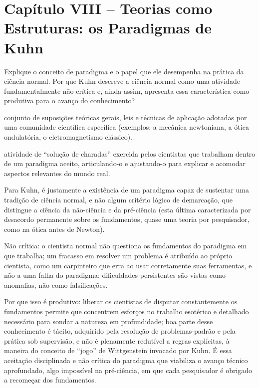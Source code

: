\documentclass[10pt]{extarticle}
\newcommand{\resposta}[1]{\par\smallskip\noindent #1}
\begin{document}
\section*{Capítulo VIII -- Teorias como Estruturas: os Paradigmas de Kuhn}
\begin{questoes}

\item Explique o conceito de paradigma e o papel que ele desempenha na prática da ciência normal. Por que Kuhn descreve a ciência normal como uma atividade fundamentalmente não crítica e, ainda assim, apresenta essa característica como produtiva para o avanço do conhecimento?

\resposta{
\begin{topicos}
\item[Paradigma:] conjunto de suposições teóricas gerais, leis e técnicas de aplicação adotadas por uma comunidade científica específica (exemplos: a mecânica newtoniana, a ótica ondulatória, o eletromagnetismo clássico).
\item[Ciência normal:] atividade de \enquote{solução de charadas} exercida pelos cientistas que trabalham dentro de um paradigma aceito, articulando-o e ajustando-o para explicar e acomodar aspectos relevantes do mundo real.
\item Para Kuhn, é justamente a existência de um paradigma capaz de sustentar uma tradição de ciência normal, e não algum critério lógico de demarcação, que distingue a ciência da não-ciência e da pré-ciência (esta última caracterizada por desacordo permanente sobre os fundamentos, quase uma teoria por pesquisador, como na ótica antes de Newton).
\item Não crítica: o cientista normal não questiona os fundamentos do paradigma em que trabalha; um fracasso em resolver um problema é atribuído ao próprio cientista, como um carpinteiro que erra ao usar corretamente suas ferramentas, e não a uma falha do paradigma; dificuldades persistentes são vistas como anomalias, não como falsificações.
\item Por que isso é produtivo: liberar os cientistas de disputar constantemente os fundamentos permite que concentrem esforços no trabalho esotérico e detalhado necessário para sondar a natureza em profundidade; boa parte desse conhecimento é tácito, adquirido pela resolução de problemas-padrão e pela prática sob supervisão, e não é plenamente redutível a regras explícitas, à maneira do conceito de \enquote{jogo} de Wittgenstein invocado por Kuhn. É essa aceitação disciplinada e não crítica do paradigma que viabiliza o avanço técnico aprofundado, algo impossível na pré-ciência, em que cada pesquisador é obrigado a recomeçar dos fundamentos.
\end{topicos}
}


\end{questoes}
\end{document}
